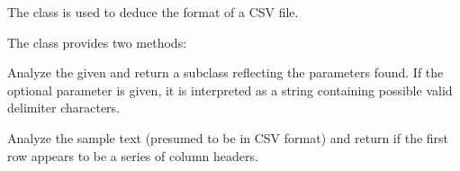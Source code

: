 \documentclass[letterpaper,10pt,english]{sphinxmanual}
\begin{document}

\begin{fulllineitems}
\label{\detokenize{csv:csv.Sniffer}}
The {\hyperref[\detokenize{csv:csv.Sniffer}]{}} class is used to deduce the format of a CSV file.

The {\hyperref[\detokenize{csv:csv.Sniffer}]{}} class provides two methods:

\begin{fulllineitems}
\label{\detokenize{csv:csv.Sniffer.sniff}}
Analyze the given  and return a {\hyperref[\detokenize{csv:csv.Dialect}]{}} subclass
reflecting the parameters found.  If the optional  parameter
is given, it is interpreted as a string containing possible valid
delimiter characters.

\end{fulllineitems}


\begin{fulllineitems}
\label{\detokenize{csv:csv.Sniffer.has_header}}
Analyze the sample text (presumed to be in CSV format) and return
 if the first row appears to be a series of column headers.

\end{fulllineitems}


\end{fulllineitems}
\end{document}
